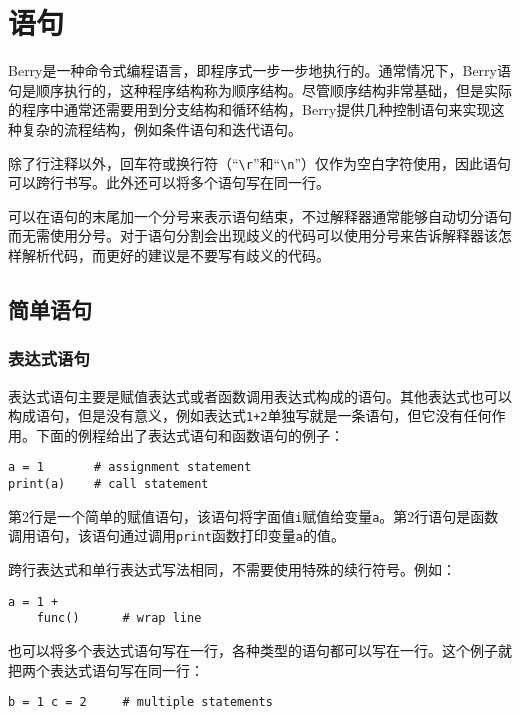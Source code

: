 \chapter{语句}

Berry是一种命令式编程语言，即程序式一步一步地执行的。通常情况下，Berry语句是顺序执行的，这种程序结构称为顺序结构。尽管顺序结构非常基础，但是实际的程序中通常还需要用到分支结构和循环结构，Berry提供几种控制语句来实现这种复杂的流程结构，例如条件语句和迭代语句。

除了行注释以外，回车符或换行符（``\texttt{\textbackslash r}''和``\texttt{\textbackslash n}''）仅作为空白字符使用，因此语句可以跨行书写。此外还可以将多个语句写在同一行。

可以在语句的末尾加一个分号来表示语句结束，不过解释器通常能够自动切分语句而无需使用分号。对于语句分割会出现歧义的代码可以使用分号来告诉解释器该怎样解析代码，而更好的建议是不要写有歧义的代码。

\section{简单语句}

\subsection{表达式语句}

表达式语句主要是赋值表达式或者函数调用表达式构成的语句。其他表达式也可以构成语句，但是没有意义，例如表达式\texttt{1+2}单独写就是一条语句，但它没有任何作用。下面的例程给出了表达式语句和函数语句的例子：
\begin{lstlisting}[language=berry, numbers=none]
a = 1       # assignment statement
print(a)    # call statement
\end{lstlisting}
第2行是一个简单的赋值语句，该语句将字面值\texttt{i}赋值给变量\texttt{a}。第2行语句是函数调用语句，该语句通过调用\texttt{print}函数打印变量\texttt{a}的值。

跨行表达式和单行表达式写法相同，不需要使用特殊的续行符号。例如：
\begin{lstlisting}[language=berry, numbers=none]
a = 1 +
    func()      # wrap line
\end{lstlisting}
也可以将多个表达式语句写在一行，各种类型的语句都可以写在一行。这个例子就把两个表达式语句写在同一行：
\begin{lstlisting}[language=berry, numbers=none]
b = 1 c = 2     # multiple statements
\end{lstlisting}

